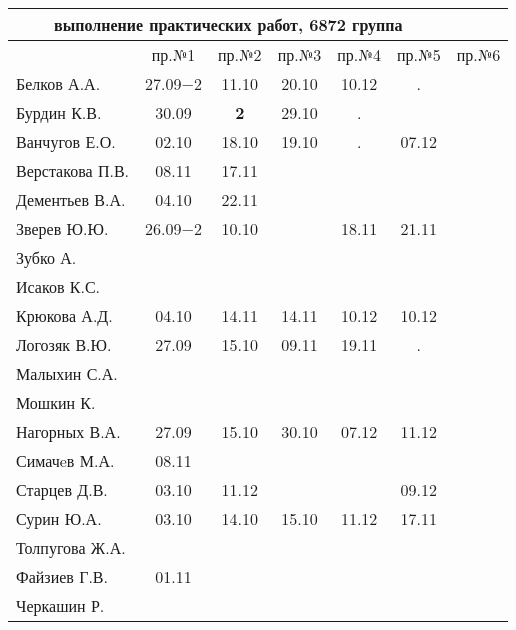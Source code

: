 \documentclass[a4paper,landscape,11pt]{article}
\begin{document}
\newpage
\begin{tabular}{l|cccccc}
\multicolumn{6}{c}{выполнение практических работ, 6872 группа} \\
\toprule
               & пр.№1   & пр.№2 &пр.№3&пр.№4&пр.№5&пр.№6\\
\midrule
Белков А.А.    &27.09$-2$&11.10  &20.10&10.12&  .  &\\   
Бурдин К.В.    &30.09    &{\bf 2}&29.10& .   &     &\\
Ванчугов Е.О.  &02.10    &18.10  &19.10& .   &07.12&\\
Верстакова П.В.&08.11    &17.11  &     &     &     &\\
Дементьев В.А. &04.10    &22.11  &     &     &     &\\
Зверев Ю.Ю.    &26.09$-2$&10.10  &     &18.11&21.11&\\
Зубко А.       &         &       &     &     &     &\\
Исаков К.С.    &         &       &     &     &     &\\
Крюкова А.Д.   &04.10    &14.11  &14.11&10.12&10.12&\\
Логозяк В.Ю.   &27.09    &15.10  &09.11&19.11&.    &\\
Малыхин С.А.   &         &       &     &     &     &\\
Мошкин К.      &         &       &     &     &     &\\
Нагорных В.А.  &27.09    &15.10  &30.10&07.12&11.12&\\
Симачeв М.А.   &08.11    &       &     &     &     &\\
Старцев Д.В.   &03.10    &11.12  &     &     &09.12&\\
Сурин Ю.А.     &03.10    &14.10  &15.10&11.12&17.11&\\
Толпугова Ж.А. &         &       &     &     &     &\\
Файзиев Г.В.   &01.11    &       &     &     &     &\\
Черкашин Р.    &         &       &     &     &     &\\
\bottomrule
\end{tabular}
\end{document}
